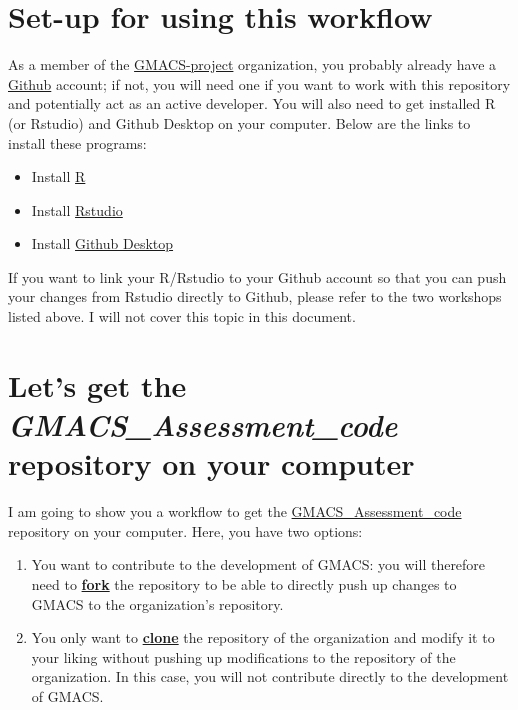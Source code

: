 \documentclass[
]{article}
\providecommand{\tightlist}{%
  \setlength{\itemsep}{0pt}\setlength{\parskip}{0pt}}
\begin{document}
\hypertarget{set-up-for-using-this-workflow}{%
\section{Set-up for using this
workflow}\label{set-up-for-using-this-workflow}}

As a member of the
\href{https://github.com/GMACS-project}{GMACS-project} organization, you
probably already have a \href{https://github.com/}{Github} account; if
not, you will need one if you want to work with this repository and
potentially act as an active developer. You will also need to get
installed R (or Rstudio) and Github Desktop on your computer. Below are
the links to install these programs:

\begin{itemize}
\tightlist
\item
  Install \href{https://cran.r-project.org/}{R}
\item
  Install
  \href{https://www.rstudio.com/products/rstudio/download/}{Rstudio}
\item
  Install \href{https://desktop.github.com/}{Github Desktop}
\end{itemize}

If you want to link your R/Rstudio to your Github account so that you
can push your changes from Rstudio directly to Github, please refer to
the two workshops listed above. I will not cover this topic in this
document.

\hypertarget{lets-get-the-gmacs_assessment_code-repository-on-your-computer}{%
\section{\texorpdfstring{Let's get the \emph{GMACS\_Assessment\_code}
repository on your
computer}{Let's get the GMACS\_Assessment\_code repository on your computer}}\label{lets-get-the-gmacs_assessment_code-repository-on-your-computer}}

I am going to show you a workflow to get the
\href{https://github.com/GMACS-project/GMACS_Assessment_code}{GMACS\_Assessment\_code}
repository on your computer. Here, you have two options:

\begin{enumerate}
\def\labelenumi{\arabic{enumi}.}
\tightlist
\item
  You want to contribute to the development of GMACS: you will therefore
  need to \protect\hyperlink{Fork-repo}{\textbf{fork}} the repository to
  be able to directly push up changes to GMACS to the organization's
  repository.
\item
  You only want to \protect\hyperlink{Copy-repo}{\textbf{clone}} the
  repository of the organization and modify it to your liking without
  pushing up modifications to the repository of the organization. In
  this case, you will not contribute directly to the development of
  GMACS.
\end{enumerate}
\end{document}
